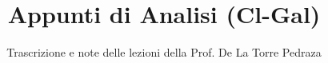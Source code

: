 \documentclass[a4paper,12pt]{article}
\title{Appunti di Analisi (Cl-Gal)}
\author{Trascrizione e note delle lezioni della Prof. De La Torre Pedraza}
\date{}
\begin{document}
\maketitle
\projectintro
\tableofcontents
\newpage

\end{document}
